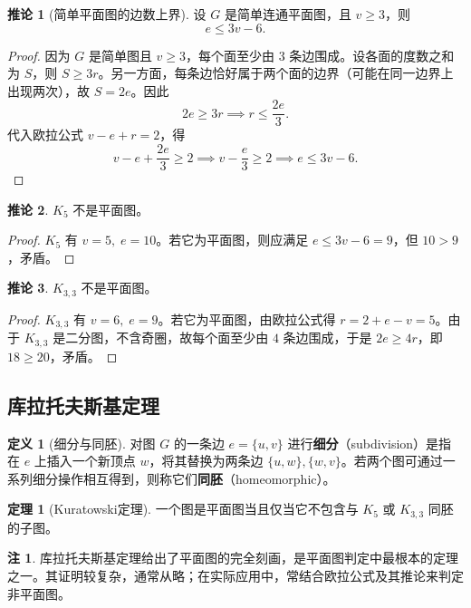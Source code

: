 \documentclass[UTF8,11pt,a4paper]{ctexbook}   %
\theoremstyle{definition}
\newtheorem{definition}{定义}[section]
\newtheorem{theorem}{定理}[section]
\newtheorem{remark}{注}[section]
\newtheorem{corollary}{推论}[section]
\begin{document}
\begin{corollary}[简单平面图的边数上界]
设 $G$ 是简单连通平面图，且 $v\ge 3$，则
\[
e \le 3v - 6.
\]
\end{corollary}

\begin{proof}
因为 $G$ 是简单图且 $v\ge 3$，每个面至少由 $3$ 条边围成。设各面的度数之和为 $S$，则 $S\ge 3r$。另一方面，每条边恰好属于两个面的边界（可能在同一边界上出现两次），故 $S=2e$。因此
\[
2e \ge 3r \implies r \le \frac{2e}{3}.
\]
代入欧拉公式 $v-e+r=2$，得
\[
v - e + \frac{2e}{3} \ge 2 \implies v - \frac{e}{3} \ge 2 \implies e \le 3v - 6.
\]
\end{proof}

\begin{corollary}
$K_5$ 不是平面图。
\end{corollary}

\begin{proof}
$K_5$ 有 $v=5,\;e=10$。若它为平面图，则应满足 $e\le 3v-6=9$，但 $10>9$，矛盾。
\end{proof}

\begin{corollary}
$K_{3,3}$ 不是平面图。
\end{corollary}

\begin{proof}
$K_{3,3}$ 有 $v=6,\;e=9$。若它为平面图，由欧拉公式得 $r=2+e-v=5$。由于 $K_{3,3}$ 是二分图，不含奇圈，故每个面至少由 $4$ 条边围成，于是 $2e\ge 4r$，即 $18\ge 20$，矛盾。
\end{proof}

\subsection{库拉托夫斯基定理}

\begin{definition}[细分与同胚]
对图 $G$ 的一条边 $e=\{u,v\}$ 进行\textbf{细分}（subdivision）是指在 $e$ 上插入一个新顶点 $w$，将其替换为两条边 $\{u,w\},\{w,v\}$。若两个图可通过一系列细分操作相互得到，则称它们\textbf{同胚}（homeomorphic）。
\end{definition}

\begin{theorem}[Kuratowski定理]
一个图是平面图当且仅当它不包含与 $K_5$ 或 $K_{3,3}$ 同胚的子图。
\end{theorem}

\begin{remark}
库拉托夫斯基定理给出了平面图的完全刻画，是平面图判定中最根本的定理之一。其证明较复杂，通常从略；在实际应用中，常结合欧拉公式及其推论来判定非平面图。
\end{remark}
\end{document}
